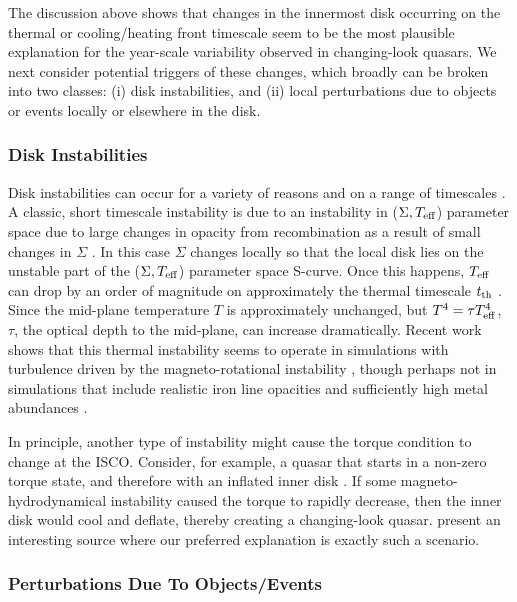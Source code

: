 \documentclass[iop]{emulateapj}
\def\eg{{e.g.}}
\begin{document}
The discussion above shows that changes in the innermost disk
occurring on the thermal or cooling/heating front timescale seem
to be the most plausible explanation for the year-scale variability
observed in changing-look quasars.  We next consider potential
triggers of these changes, which broadly can be broken into two
classes: (i) disk instabilities, and (ii) local perturbations due
to objects or events locally or elsewhere in the disk.


\subsubsection{Disk Instabilities}

Disk instabilities can occur for a variety of reasons and on a range
of timescales \citep[\eg,][]{Lightman:74, Shakura:76, Lightman:76}.
A classic, short timescale instability is due to an instability in
($\Sigma,T_{\rm eff}$) parameter space due to large changes in
opacity from recombination as a result of small changes in $\Sigma$
\cite[\eg,][]{Lin:86}. In this case $\Sigma$ changes locally
so that the local disk lies on the unstable part of the ($\Sigma,
T_{\rm eff}$) parameter space S-curve. Once this happens, $T_{\rm
eff}$ can drop by an order of magnitude on approximately the thermal
timescale $t_{\rm th}$ \citep[or some small multiple
thereof;][]{Shakura:76}.  Since the mid-plane temperature $T$ is
approximately unchanged, but $T^{4}=\tau T_{\rm eff}^{4}$, $\tau$,
the optical depth to the mid-plane, can increase dramatically. 
Recent work shows that this thermal instability seems to operate
in simulations with turbulence driven by the magneto-rotational
instability \citep[MRI;][]{Jiang:14}, though perhaps not in simulations
that include realistic iron line opacities and sufficiently high
metal abundances \citep{Jiang:16}.

In principle, another type of instability might cause the torque
condition to change at the ISCO.  Consider, for example, a quasar
that starts in a non-zero torque state, and therefore with an
inflated inner disk \citep[\eg][]{Sirko:03}.  If some
magneto-hydrodynamical instability caused the torque to rapidly
decrease, then the inner disk would cool and deflate, thereby
creating a changing-look quasar.  \citet{Ross:18} present an
interesting source where our preferred explanation is exactly such
a scenario.


\subsubsection{Perturbations Due To Objects/Events}
\label{sec:emri}
\end{document}
